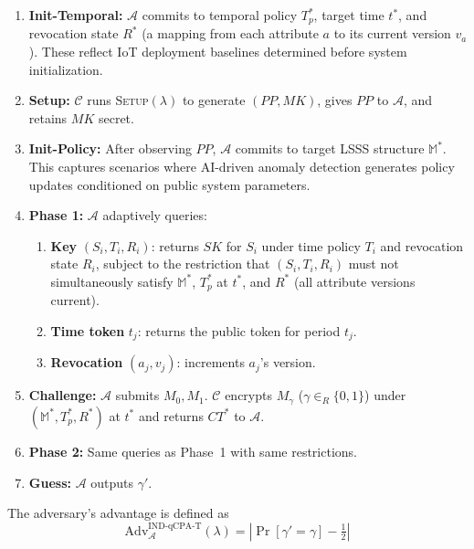 \documentclass[lettersize,journal]{IEEEtran}
\begin{document}
\begin{enumerate}
    \item \textbf{Init-Temporal:} $\mathcal{A}$ commits to temporal policy $T_p^*$,
    target time $t^*$, and revocation state $R^*$ (a mapping from each attribute
    $a$ to its current version $v_a$). These reflect IoT deployment baselines
    determined before system initialization.
    \item \textbf{Setup:} $\mathcal{C}$ runs \textsc{Setup}$(\lambda)$ to
    generate $(PP, MK)$, gives $PP$ to $\mathcal{A}$, and retains $MK$
    secret.
    \item \textbf{Init-Policy:} After observing $PP$, $\mathcal{A}$ commits to
    target LSSS structure $\mathbb{M}^*$. This captures scenarios where
    AI-driven anomaly detection generates policy updates conditioned on
    public system parameters.
    \item \textbf{Phase 1:} $\mathcal{A}$ adaptively queries:
    \begin{enumerate}
        \item \textbf{Key} $(S_i, T_i, R_i)$: returns $SK$ for $S_i$ under
        time policy $T_i$ and revocation state $R_i$, subject to the
        restriction that $(S_i, T_i, R_i)$ must not simultaneously satisfy
        $\mathbb{M}^*$, $T_p^*$ at $t^*$, and $R^*$ (all attribute
        versions current).
        \item \textbf{Time token} $t_j$: returns the public token for period
        $t_j$.
        \item \textbf{Revocation} $(a_j, v_j)$: increments $a_j$'s version.
    \end{enumerate}
    \item \textbf{Challenge:} $\mathcal{A}$ submits $M_0, M_1$. $\mathcal{C}$
    encrypts $M_\gamma$ ($\gamma \in_R \{0,1\}$) under $(\mathbb{M}^*,
    T_p^*, R^*)$ at $t^*$ and returns $CT^*$ to $\mathcal{A}$.
    \item \textbf{Phase 2:} Same queries as Phase~1 with same restrictions.
    \item \textbf{Guess:} $\mathcal{A}$ outputs $\gamma'$.
\end{enumerate}

The adversary's advantage is defined as
\begin{equation}
    \text{Adv}_{\mathcal{A}}^{\text{IND-qCPA-T}}(\lambda)
    = \left|\Pr[\gamma' = \gamma] - \tfrac{1}{2}\right|
    \label{eq:adv_indscpat}
\end{equation}
\end{document}
